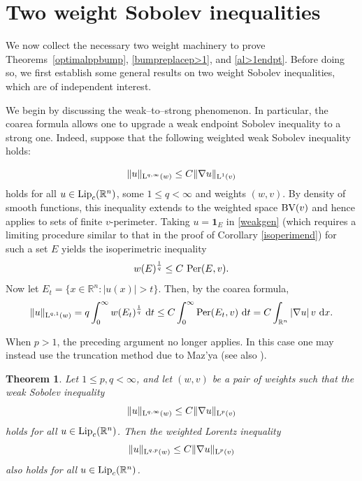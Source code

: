 \documentclass[11pt, a4paper, reqno]{amsart}
\newcommand{\R}{\mathbb R}
\newcommand{\dx}{\,{\mathrm dx}}
\newcommand{\dt}{\,{\mathrm dt}}
\newcommand{\Lup}{\textup{L}}
\newcommand{\BV}{\textup{BV}}
\DeclareMathOperator{\Lip}{\textup{Lip}}
\DeclareMathOperator{\Per}{\textup{Per}}
\newtheorem{theorem}{Theorem}[section]
\theoremstyle{definition}
\theoremstyle{remark}
\begin{document}
\section{Two weight Sobolev inequalities}\label{twoweight}

We now collect the necessary two weight machinery to prove Theorems~\ref{optimalppbump}, \ref{bumpreplacep>1}, and \ref{al>1endpt}. Before doing so, we first establish some general results on two weight Sobolev inequalities, which are of independent interest. 

We begin by discussing the weak–to–strong phenomenon. In particular, the coarea formula allows one to upgrade a weak endpoint Sobolev inequality to a strong one. Indeed, suppose that the following weighted weak Sobolev inequality holds:


\begin{equation}\label{weakgen}
\|u\|_{\Lup^{q,\infty}(w)} \le C \|\nabla u\|_{\Lup^1(v)}
\end{equation}
holds for all $u \in \Lip_c(\R^n)$, some $1 \le q < \infty$ and weights $(w,v)$.  By density of smooth functions, this inequality extends to the weighted space $\BV(v)$ and hence applies to sets of finite $v$-perimeter.  
Taking $u=\mathbf{1}_E$ in \eqref{weakgen} (which requires a limiting procedure similar to that in the proof of Corollary \ref{isoperimend}) for such a set $E$ yields the isoperimetric inequality
\[
w(E)^{\frac1q} \le C\,\Per(E,v).
\]
Now let $E_t=\{x\in\R^n : |u(x)|>t\}$.  
Then, by the coarea formula,
\begin{equation*}
\|u\|_{\Lup^{q,1}(w)}
= q\int_0^\infty w(E_t)^{\frac1q}\,\dt
\le C\int_0^\infty \Per(E_t,v)\,\dt
= C\int_{\R^n} |\nabla u|\,v\,\dx.
\end{equation*}

When $p>1$, the preceding argument no longer applies.  
In this case one may instead use the truncation method due to Maz'ya \cite{Maz} (see also \cite{Haj2}).

\begin{theorem}\label{weakstrong}
Let $1 \le p,q < \infty$, and let $(w,v)$ be a pair of weights such that the weak Sobolev inequality
\begin{equation}\label{weakSob}
\|u\|_{\Lup^{q,\infty}(w)} \le C \|\nabla u\|_{\Lup^{p}(v)}
\end{equation}
holds for all $u \in \Lip_c(\R^n)$.  
Then the weighted Lorentz inequality
\begin{equation}\label{weakimpLorentz}
\|u\|_{\Lup^{q,p}(w)} \le C \|\nabla u\|_{\Lup^{p}(v)}
\end{equation}
also holds for all $u \in \Lip_c(\R^n)$.
\end{theorem}
\end{document}
